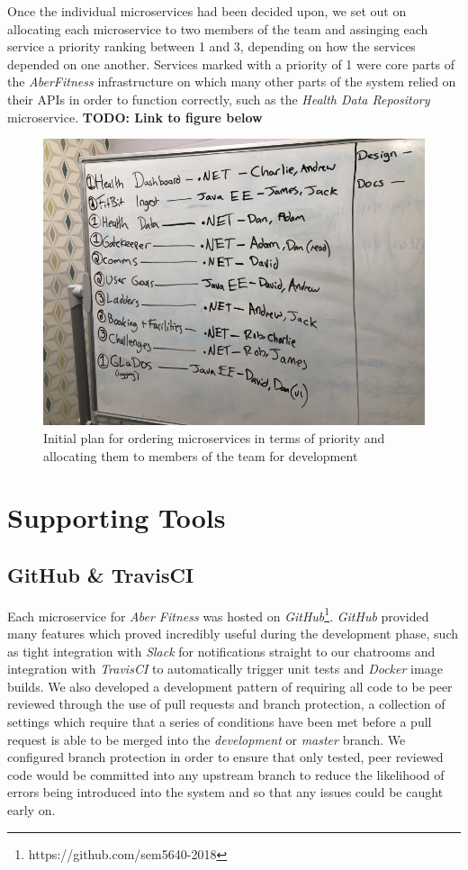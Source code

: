 Once the individual microservices had been decided upon, we set out on allocating each microservice to two members of the team and assinging each service a priority ranking between 1 and 3, depending on how the services depended on one another. Services marked with a priority of 1 were core parts of the \textit{AberFitness} infrastructure on which many other parts of the system relied on their APIs in order to function correctly, such as the \textit{Health Data Repository} microservice.  \textbf{TODO: Link to figure below}

\begin{figure}[H]
    \centering
    \includegraphics[width=\textwidth]{Images/Numbering_Microservices.jpg}
    \caption{Initial plan for ordering microservices in terms of priority and allocating them to members of the team for development}
\end{figure}


\section{Supporting Tools}
\subsection{GitHub \& TravisCI}
Each microservice for \textit{Aber Fitness} was hosted on \textit{GitHub}\footnote{https://github.com/sem5640-2018}. \textit{GitHub} provided many features which proved incredibly useful during the development phase, such as tight integration with \textit{Slack} for notifications straight to our chatrooms and integration with \textit{TravisCI} to automatically trigger unit tests and \textit{Docker} image builds. We also developed a development pattern of requiring all code to be peer reviewed through the use of pull requests and branch protection, a collection of settings which require that a series of conditions have been met before a pull request is able to be merged into the \textit{development} or \textit{master} branch. We configured branch protection in order to ensure that only tested, peer reviewed code would be committed into any upstream branch to reduce the likelihood of errors being introduced into the system and so that any issues could be caught early on. 

